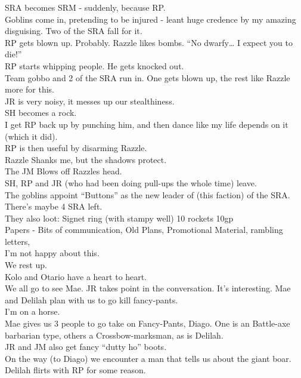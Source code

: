 SRA becomes SRM - suddenly, because RP.\\
Goblins come in, pretending to be injured - leant huge credence by my amazing disguising. Two of the SRA fall for it.\\
RP gets blown up. Probably. Razzle likes bombs. “No dwarfy… I expect you to die!”\\
RP starts whipping people. He gets knocked out.\\
Team gobbo and 2 of the SRA run in. One gets blown up, the rest like Razzle more for this.\\
JR is very noisy, it messes up our stealthiness.\\
SH becomes a rock.\\
I get RP back up by punching him, and then dance like my life depends on it (which it did).\\
RP is then useful by disarming Razzle.\\
Razzle Shanks me, but the shadows protect.\\
The JM Blows off Razzles head.\\
SH, RP and JR (who had been doing pull-ups the whole time) leave.\\
The goblins appoint “Buttons” as the new leader of (this faction) of the SRA.\\
There's maybe 4 SRA left.\\
They also loot: Signet ring (with stampy well) 10 rockets 10gp\\
Papers - Bits of communication, Old Plans, Promotional Material, rambling letters,\\
I’m not happy about this.\\
We rest up.\\
Kolo and Otario have a heart to heart.\\
We all go to see Mae. JR takes point in the conversation. It’s interesting. Mae and Delilah plan with us to go kill fancy-pants.\\
I’m on a horse.\\
Mae gives us 3 people to go take on Fancy-Pants, Diago. One is an Battle-axe barbarian type, others a Crossbow-marksman, as is Delilah.\\
JR and JM also get fancy “dutty ho” boots.\\
On the way (to Diago) we encounter a man that tells us about the giant boar. Delilah flirts with RP for some reason.\medskip

